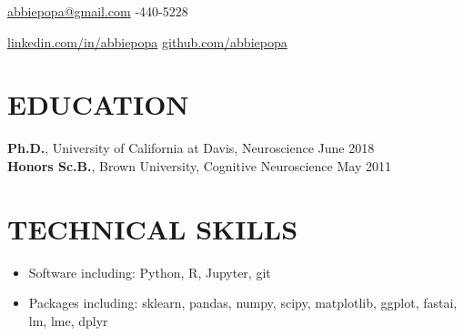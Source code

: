 \documentclass[line,margin,10pt]{res}
\begin{document}
 
\begin{resume}
\hoffset\centerline 
{\hyperref[abbiepopa@gmail.com]{abbiepopa@gmail.com} \quad \quad \quad \quad  \quad \quad \quad \quad \quad \quad \quad \quad \quad \quad \quad \quad \quad \quad \quad \quad \quad\quad \quad \quad \quad \quad \quad \quad \quad \quad \quad \quad  \quad \quad {}-440-5228}
\hoffset\centerline 
{\hspace{0.05cm} \hyperref[linkedin.com/in/abbiepopa]{linkedin.com/in/abbiepopa} \quad \quad \quad \quad \quad \quad \quad \quad \quad \quad \quad\quad \quad \quad \quad \quad \quad \quad \quad \quad \quad \quad  \quad \quad \quad  \quad \quad \quad   \quad \hyperref[github.com/abbiepopa]{github.com/abbiepopa}}
 
\section{EDUCATION} 
\textbf{Ph.D.}, University of California at Davis, Neuroscience \hfill June 2018\\
\textbf{Honors Sc.B.}, Brown University, Cognitive Neuroscience \hfill May 2011\\

 \section{TECHNICAL SKILLS} 
 \begin{itemize}[leftmargin=-2pt] \itemsep -2pt
\item [] Software including: Python, R, Jupyter, git%
\item []Packages including: sklearn, pandas, numpy, scipy, matplotlib, ggplot, fastai, lm, lme, dplyr%
 \end{itemize}


\end{resume}
\end{document}
